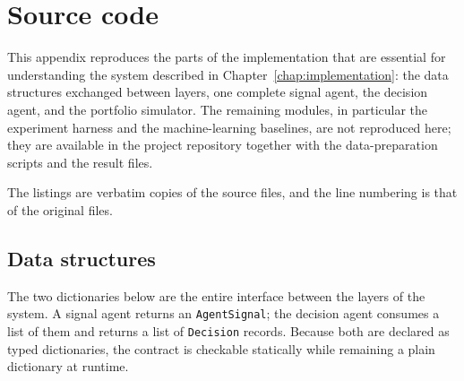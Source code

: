 \chapter{Source code}\label{app:source_code}

This appendix reproduces the parts of the implementation that are essential for understanding the system described in Chapter~\ref{chap:implementation}: the data structures exchanged between layers, one complete signal agent, the decision agent, and the portfolio simulator. The remaining modules, in particular the experiment harness and the machine-learning baselines, are not reproduced here; they are available in the project repository together with the data-preparation scripts and the result files.

The listings are verbatim copies of the source files, and the line numbering is that of the original files.

\section{Data structures}\label{app:data_structures}

The two dictionaries below are the entire interface between the layers of the system. A signal agent returns an \texttt{AgentSignal}; the decision agent consumes a list of them and returns a list of \texttt{Decision} records. Because both are declared as typed dictionaries, the contract is checkable statically while remaining a plain dictionary at runtime.

\begin{center}
  \captionsetup{type=listing}
  \label{lst:agent_signal}
  \inputminted[linenos, frame=single, breaklines, fontsize=\footnotesize]{python}{other/AgentSignal.py}
\end{center}

\begin{center}
  \captionsetup{type=listing}
  \label{lst:decision}
  \inputminted[linenos, frame=single, breaklines, fontsize=\footnotesize]{python}{other/Decision.py}
\end{center}

